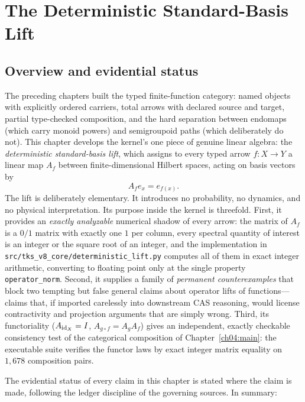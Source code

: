 \chapter{The Deterministic Standard-Basis Lift}\label{ch07:chap}

\section{Overview and evidential status}\label{ch07:sec:overview}

The preceding chapters built the typed finite-function category: named objects
with explicitly ordered carriers, total arrows with declared source and target,
partial type-checked composition, and the hard separation between endomaps
(which carry monoid powers) and semigroupoid paths (which deliberately do
not). This chapter develops the kernel's one piece of genuine linear algebra:
the \emph{deterministic standard-basis lift}, which assigns to every typed
arrow $f:X\to Y$ a linear map $A_f$ between finite-dimensional Hilbert spaces,
acting on basis vectors by
\[
A_f e_x = e_{f(x)} .
\]
The lift is deliberately elementary. It introduces no probability, no
dynamics, and no physical interpretation. Its purpose inside the kernel is
threefold. First, it provides an \emph{exactly analyzable} numerical shadow of
every arrow: the matrix of $A_f$ is a $0/1$ matrix with exactly one $1$ per
column, every spectral quantity of interest is an integer or the square root
of an integer, and the implementation in
\texttt{src/tks\_v8\_core/deterministic\_lift.py} computes all of them in exact
integer arithmetic, converting to floating point only at the single property
\texttt{operator\_norm}. Second, it supplies a family of \emph{permanent
counterexamples} that block two tempting but false general claims about
operator lifts of functions---claims that, if imported carelessly into
downstream CAS reasoning, would license contractivity and projection
arguments that are simply wrong. Third, its functoriality
($A_{\mathrm{id}_X}=I$, $A_{g\circ f}=A_g A_f$) gives an independent, exactly
checkable consistency test of the categorical composition of
Chapter~\ref{ch04:main}: the executable suite verifies the functor laws by
exact integer matrix equality on $1{,}678$ composition pairs.

The evidential status of every claim in this chapter is stated where the claim
is made, following the ledger discipline of the governing sources. In summary:


